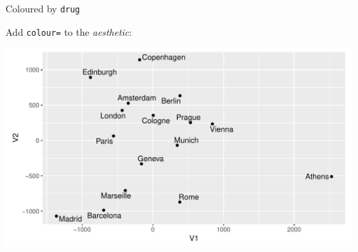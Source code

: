 \begin{frame}[fragile]{Coloured by \texttt{drug}}
  
Add \texttt{colour=} to the \emph{aesthetic}:

\begin{knitrout}
\color{fgcolor}\begin{kframe}
\begin{alltt}
\hlstd{(}\hlopt{+}
  \hlstd{()}
\end{alltt}
\end{kframe}
\includegraphics[width=\maxwidth]{figure/unnamed-chunk-9-1} 

\end{knitrout}
  
\end{frame}

